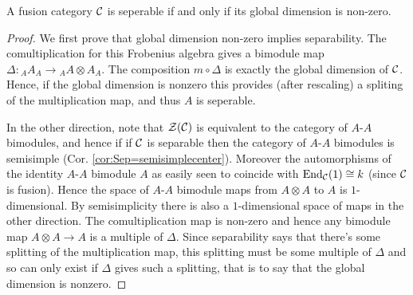 \documentclass{amsart}
\begin{document}
\begin{maintheorem} \label{thm:NonzeroDimension}
A fusion category $\mathcal C$ is seperable if and only if its global dimension is non-zero.
\end{maintheorem}
\begin{proof}
We first prove that global dimension non-zero implies separability. The comultiplication for this Frobenius algebra gives a bimodule map $\Delta: {}_A A_A \rightarrow {}_A A \otimes A_A$.  The composition $m \circ \Delta$ is exactly the global dimension of $\mathcal C$.  Hence, if the global dimension is nonzero this provides (after rescaling) a spliting of the multiplication map, and thus $A$ is seperable.



In the other direction, note that $\mathcal Z(\mathcal C)$ is equivalent to the category of $A$-$A$ bimodules, and hence if  if $\mathcal C$ is separable then the category of $A$-$A$ bimodules is semisimple (Cor. \ref{cor:Sep=semisimplecenter}).  
 Moreover the automorphisms of the identity $A$-$A$ bimodule $A$ as easily seen to coincide with $\operatorname{End}_{\mathcal C}(1) \cong k$ (since $\mathcal C$ is fusion). Hence the space of $A$-$A$ bimodule maps from $A \otimes A$ to $A$  is $1$-dimensional. By semisimplicity there is also a $1$-dimensional space of maps in the other direction. The comultiplication map is non-zero and hence any bimodule map $A \otimes A \rightarrow A$ is a multiple of $\Delta$.  Since separability says that there's some splitting of the multiplication map, this splitting must be some multiple of $\Delta$ and so can only exist if $\Delta$ gives such a splitting, that is to say that the global dimension is nonzero.
\end{proof}
\end{document}

